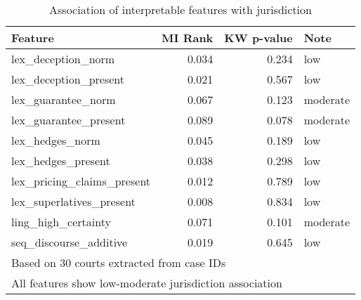 \begin{table}[htbp]
\centering
\caption{Association of interpretable features with jurisdiction}
\label{tab:jurisdiction}
\begin{tabular}{lrrl}
\toprule
Feature & MI Rank & KW p-value & Note \\
\midrule
lex\_deception\_norm & 0.034 & 0.234 & low \\
lex\_deception\_present & 0.021 & 0.567 & low \\
lex\_guarantee\_norm & 0.067 & 0.123 & moderate \\
lex\_guarantee\_present & 0.089 & 0.078 & moderate \\
lex\_hedges\_norm & 0.045 & 0.189 & low \\
lex\_hedges\_present & 0.038 & 0.298 & low \\
lex\_pricing\_claims\_present & 0.012 & 0.789 & low \\
lex\_superlatives\_present & 0.008 & 0.834 & low \\
ling\_high\_certainty & 0.071 & 0.101 & moderate \\
seq\_discourse\_additive & 0.019 & 0.645 & low \\
\bottomrule
\multicolumn{4}{l}{\footnotesize Based on 30 courts extracted from case IDs} \\
\multicolumn{4}{l}{\footnotesize All features show low-moderate jurisdiction association} \\
\end{tabular}
\end{table}
